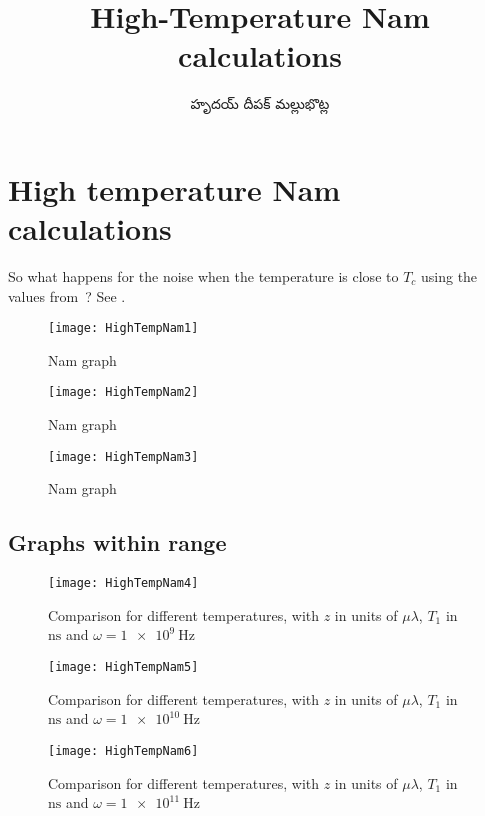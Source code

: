 \documentclass[../main.tex]{subfiles}
\title{High-Temperature Nam calculations}
\author{\begin{telugu}హృదయ్ దీపక్ మల్లుభొట్ల\end{telugu}}
\date{}
\begin{document}
	\graphicspath{{\main/figures/}}

	\onlyinsubfile{\maketitle}

	\section{High temperature Nam calculations} \label{sec:htn:intro}

	So what happens for the noise when the temperature is close to $T_c$ using the values from~\cite{Nam1967}?
	See .

	\begin{figure}[htp]
		\centering
		\texttt{[image: HighTempNam1]}
		\caption{Nam graph} \label{fig:htn:1}
	\end{figure}
	\begin{figure}[htp]
		\centering
		\texttt{[image: HighTempNam2]}
		\caption{Nam graph} \label{fig:htn:2}
	\end{figure}
	\begin{figure}[htp]
		\centering
		\texttt{[image: HighTempNam3]}
		\caption{Nam graph} \label{fig:htn:3}
	\end{figure}

	\subsection{Graphs within range} \label{subsec:htn:smallergraphs}
	\begin{figure}[htp]
		\centering
		\texttt{[image: HighTempNam4]}
		\caption{Comparison for different temperatures, with $z$ in units of $\mu \lambda$, $T_1$ in $\si{\nano\second}$ and $\omega = \SI{1e9}{\Hz}$} \label{fig:htn:1GHz}
	\end{figure}
	\begin{figure}[htp]
		\centering
		\texttt{[image: HighTempNam5]}
		\caption{Comparison for different temperatures, with $z$ in units of $\mu \lambda$, $T_1$ in $\si{\nano\second}$ and $\omega = \SI{1e10}{\Hz}$} \label{fig:htn:10GHz}
	\end{figure}
	\begin{figure}[htp]
		\centering
		\texttt{[image: HighTempNam6]}
		\caption{Comparison for different temperatures, with $z$ in units of $\mu \lambda$, $T_1$ in $\si{\nano\second}$ and $\omega = \SI{1e11}{\Hz}$} \label{fig:htn:100GHz}
	\end{figure}
\end{document}
